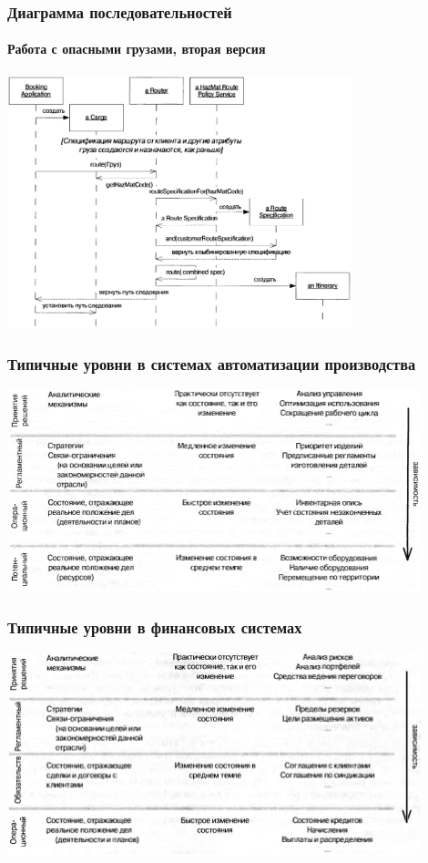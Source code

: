 \documentclass[xetex,mathserif,serif]{beamer}
\begin{document}
	\begin{frame}
		\frametitle{Диаграмма последовательностей}
		\framesubtitle{Работа с опасными грузами, вторая версия}
		\begin{center}
			\includegraphics[width=0.75\textwidth]{cargoHazMatOkSequence.png}
		\end{center}
	\end{frame}

	\begin{frame}
		\frametitle{Типичные уровни в системах автоматизации производства}
		\begin{center}
			\includegraphics[width=0.9\textwidth]{factoryAutomationLayers.png}
		\end{center}
	\end{frame}

	\begin{frame}
		\frametitle{Типичные уровни в финансовых системах}
		\begin{center}
			\includegraphics[width=0.9\textwidth]{accountingLayers.png}
		\end{center}
	\end{frame}
\end{document}
